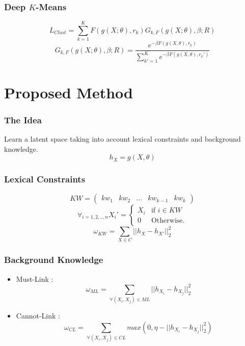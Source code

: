 \documentclass{beamer}
\begin{document}
\begin{frame}
  \frametitle{Deep $K$-Means }
\begin{equation*}
L_{Clust} = \sum_{k=1}^K F(g(X; \theta), r_k) G_{k, F}(g(X; \theta), \beta; R)
\end{equation*}
\begin{equation*}
G_{k, F}(g(X; \theta), \beta; R) = \frac{e^{-\beta F(g(X, \theta),r_k)}}
{\sum_{k' = 1}^K e^{-\beta F(g(X, \theta),r_k')}}
\end{equation*}
\end{frame}
\section{Proposed Method}

\begin{frame}
\frametitle{The Idea}
Learn a latent space taking into account lexical constraints and
background knowledge.
\pause
\begin{equation*}\label{eq:h}
  h_X = g(X,\theta)
\end{equation*}
\end{frame}

\begin{frame}
\frametitle{Lexical Constraints}
\begin{equation*}
KW = \begin{pmatrix} kw_1 & kw_2 & ... & kw_{k-1} & kw_{k}
\end {pmatrix}
\end{equation*}
\pause
\begin{equation*}
\forall_{i=1,2,..,n}X_i' = \left\{
\begin{array}{ll}
  X_i & \mbox{if } i \in KW \\
  0 & \mbox{Otherwise.}
\end{array}
\right.
\end{equation*}
\pause
\begin{equation*}\label{eq:omega1}
  \omega_{KW} = \sum_{X \in C} || h_{X} - h_{X'}||_2^2
\end{equation*}
\end{frame}

\begin{frame}
\frametitle{Background Knowledge}
\pause
\begin{itemize}
\item Must-Link : $$\omega_{ML} = \sum_{\forall{(X_i,X_j)\in ML}} || h_{X_i} - h_{X_j} ||_2^2$$ \pause
\item Cannot-Link : $$\omega_{CL} = \sum_{\forall{(X_i,X_j)\in CL}} max(0,
  \eta - || h_{X_i} - h_{X_j} ||_2^2)$$
\end{itemize}
\end{frame}
\end{document}
